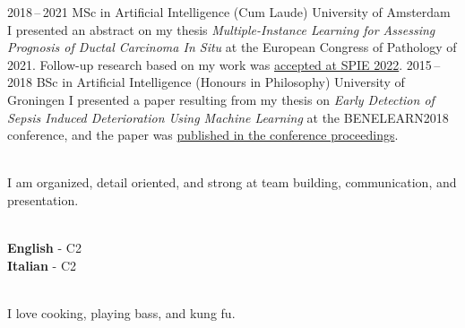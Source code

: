 \documentclass[9pt]{developercv}
\begin{document}
\begin{entrylist}
\entry
    {2018\,--\,2021}
    {MSc in Artificial Intelligence (Cum Laude)}
    {University of Amsterdam}
    {I presented an abstract on my thesis \emph{Multiple-Instance Learning for Assessing Prognosis of Ductal Carcinoma In Situ} at the European Congress of Pathology of 2021. Follow-up research based on my work was \href{https://doi.org/10.1117/12.2612838}{accepted at SPIE 2022}.}
\entry
    {2015\,--\,2018}
    {BSc in Artificial Intelligence (Honours in Philosophy)}
    {University of Groningen}
    {I presented a paper resulting from my thesis on \emph{Early Detection of Sepsis Induced Deterioration Using Machine Learning} at the BENELEARN2018 conference, and the paper was \href{https://doi.org/10.1007/978-3-030-31978-6_1}{published in the conference proceedings}.}
\end{entrylist}


\begin{minipage}[t]{0.5\textwidth}
    \vspace{-\baselineskip}
    \\
    I am organized, detail oriented, and strong at team building, communication, and presentation.
\end{minipage}
\hfill
\begin{minipage}[t]{0.2\textwidth}
    \vspace{-\baselineskip}
    \\
    \textbf{English} - C2\\
    \textbf{Italian} - C2
\end{minipage}
\hfill
\begin{minipage}[t]{0.2\textwidth}
    \vspace{-\baselineskip}
    \\
    I love cooking, playing bass, and kung fu.
\end{minipage}
\end{document}
